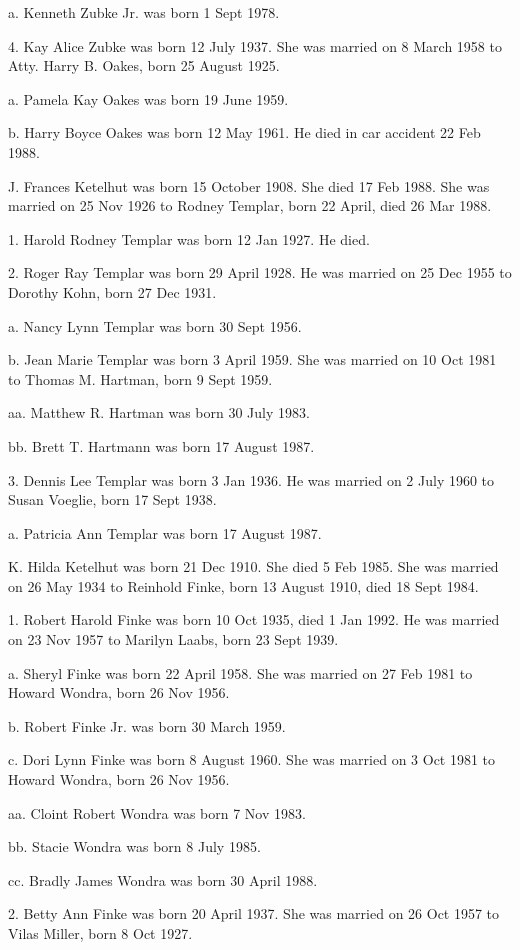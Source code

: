 \documentclass[a4paper]{article}
\begin{document}
a. Kenneth Zubke Jr. was born 1 Sept 1978.

4. Kay Alice Zubke was born 12 July 1937.  She was married on 8 March 1958 to Atty. Harry B. Oakes, born 25 August 1925. 

a. Pamela Kay Oakes was born 19 June 1959.

b. Harry Boyce Oakes was born 12 May 1961.  He died in car accident 22 Feb 1988.

J. Frances Ketelhut was born 15 October 1908.  She died 17 Feb 1988.  She was married on 25 Nov 1926 to Rodney Templar, born 22 April, died 26 Mar 1988.

1. Harold Rodney Templar was born 12 Jan 1927.  He died.

2. Roger Ray Templar was born 29 April 1928.  He was married on 25 Dec 1955 to Dorothy Kohn, born 27 Dec 1931.

a. Nancy Lynn Templar was born 30 Sept 1956.

b. Jean Marie Templar was born 3 April 1959.  She was married on 10 Oct 1981 to Thomas M. Hartman, born 9 Sept 1959.

aa. Matthew R. Hartman was born 30 July 1983.

bb. Brett T. Hartmann was born 17 August 1987.

3. Dennis Lee Templar was born 3 Jan 1936.  He was married on 2 July 1960 to Susan Voeglie, born 17 Sept 1938.

a. Patricia Ann Templar was born 17 August 1987.

K. Hilda Ketelhut was born 21 Dec 1910.  She died 5 Feb 1985.  She was married on 26 May 1934 to Reinhold Finke, born 13 August 1910, died 18 Sept 1984.

1. Robert Harold Finke was born 10 Oct 1935, died 1 Jan 1992.  He was married on 23 Nov 1957 to Marilyn Laabs, born 23 Sept 1939.

a. Sheryl Finke was born 22 April 1958.  She was married on 27 Feb 1981 to Howard Wondra, born 26 Nov 1956.

b. Robert Finke Jr. was born 30 March 1959.

c. Dori Lynn Finke was born 8 August 1960.  She was married on 3 Oct 1981 to Howard Wondra, born 26 Nov 1956.  

aa. Cloint Robert Wondra was born 7 Nov 1983.

bb. Stacie Wondra was born 8 July 1985.

cc. Bradly James Wondra was born 30 April 1988.

2. Betty Ann Finke was born 20 April  1937.  She was married on 26 Oct 1957 to Vilas Miller, born 8 Oct 1927.
\end{document}
